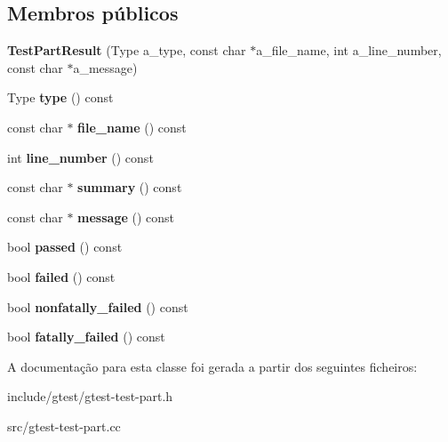 \subsection*{Membros públicos}
\begin{DoxyCompactItemize}
\item 
\hypertarget{classtesting_1_1TestPartResult_a6409eb519c1cd514aab2426c8f40737f}{{\bfseries Test\-Part\-Result} (Type a\-\_\-type, const char $\ast$a\-\_\-file\-\_\-name, int a\-\_\-line\-\_\-number, const char $\ast$a\-\_\-message)}\label{classtesting_1_1TestPartResult_a6409eb519c1cd514aab2426c8f40737f}

\item 
\hypertarget{classtesting_1_1TestPartResult_ae852bf8693f066078c74c34345531940}{Type {\bfseries type} () const }\label{classtesting_1_1TestPartResult_ae852bf8693f066078c74c34345531940}

\item 
\hypertarget{classtesting_1_1TestPartResult_a5d8742dc28ddb880cd2391edb9fc2c9b}{const char $\ast$ {\bfseries file\-\_\-name} () const }\label{classtesting_1_1TestPartResult_a5d8742dc28ddb880cd2391edb9fc2c9b}

\item 
\hypertarget{classtesting_1_1TestPartResult_a174900cf4403d23784af34f50e7b0a46}{int {\bfseries line\-\_\-number} () const }\label{classtesting_1_1TestPartResult_a174900cf4403d23784af34f50e7b0a46}

\item 
\hypertarget{classtesting_1_1TestPartResult_af0d4f960b453ce087c581fe13817b2a3}{const char $\ast$ {\bfseries summary} () const }\label{classtesting_1_1TestPartResult_af0d4f960b453ce087c581fe13817b2a3}

\item 
\hypertarget{classtesting_1_1TestPartResult_aae73962246be4d200e2c1d04246a708a}{const char $\ast$ {\bfseries message} () const }\label{classtesting_1_1TestPartResult_aae73962246be4d200e2c1d04246a708a}

\item 
\hypertarget{classtesting_1_1TestPartResult_a901bd62d9fbe7f39826a9d02ab2bdaec}{bool {\bfseries passed} () const }\label{classtesting_1_1TestPartResult_a901bd62d9fbe7f39826a9d02ab2bdaec}

\item 
\hypertarget{classtesting_1_1TestPartResult_aaf835515fb53eb1aa01c1798b05e61f6}{bool {\bfseries failed} () const }\label{classtesting_1_1TestPartResult_aaf835515fb53eb1aa01c1798b05e61f6}

\item 
\hypertarget{classtesting_1_1TestPartResult_a7bb08c87fbc1664f9fcca1504339ed29}{bool {\bfseries nonfatally\-\_\-failed} () const }\label{classtesting_1_1TestPartResult_a7bb08c87fbc1664f9fcca1504339ed29}

\item 
\hypertarget{classtesting_1_1TestPartResult_a34d31718b5fc6c06f73d03e8dbb1aa9e}{bool {\bfseries fatally\-\_\-failed} () const }\label{classtesting_1_1TestPartResult_a34d31718b5fc6c06f73d03e8dbb1aa9e}

\end{DoxyCompactItemize}


A documentação para esta classe foi gerada a partir dos seguintes ficheiros\-:\begin{DoxyCompactItemize}
\item 
include/gtest/gtest-\/test-\/part.\-h\item 
src/gtest-\/test-\/part.\-cc\end{DoxyCompactItemize}
